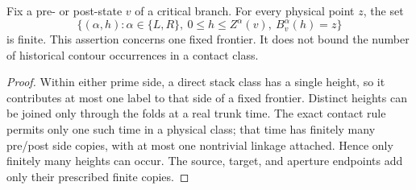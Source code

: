 \begin{corollary}
\label{cut:finite-frontier-labels}
Fix a pre- or post-state $v$ of a critical branch.  For every physical point
$z$, the set
\[
 \{(\alpha,h):\alpha\in\{L,R\},\ 0\leq h\leq Z^\alpha(v),
                   \ B^\alpha_v(h)=z\}
\]
is finite.  This assertion concerns one fixed frontier.  It does not bound
the number of historical contour occurrences in a contact class.
\end{corollary}
\begin{proof}
Within either prime side, a direct stack class has a single height, so it
contributes at most one label to that side of a fixed frontier.  Distinct
heights can be joined only through the folds at a real trunk time.  The
exact contact rule permits only one such time in a physical class; that
time has finitely many pre/post side copies, with at most one nontrivial
linkage attached.  Hence only finitely many heights can occur.  The source,
target, and aperture endpoints add only their prescribed finite copies.
\end{proof}

